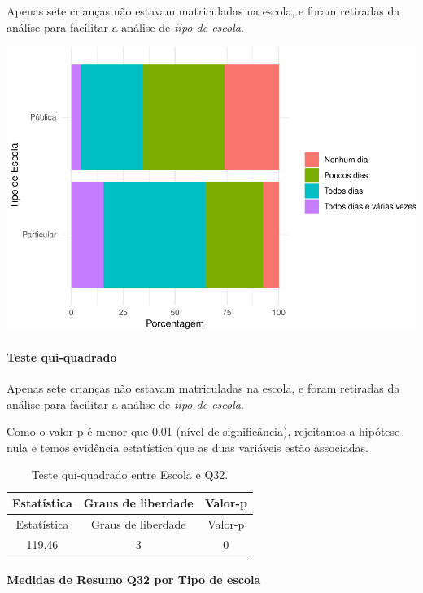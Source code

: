 \documentclass[]{article}
\let\oldparagraph\paragraph
\renewcommand{\paragraph}[1]{\oldparagraph{#1}\mbox{}}
\begin{document}
Apenas sete crianças não estavam matriculadas na escola, e foram retiradas da análise para facilitar a análise de \emph{tipo de escola}.

\begin{center}\includegraphics[width=0.75\linewidth]{relatorio_covid19_files/figure-latex/unnamed-chunk-1115-1} \end{center}

\hypertarget{teste-qui-quadrado-96}{%
\paragraph{Teste qui-quadrado}\label{teste-qui-quadrado-96}}

Apenas sete crianças não estavam matriculadas na escola, e foram retiradas da análise para facilitar a análise de \emph{tipo de escola}.

Como o valor-p é menor que 0.01 (nível de significância), rejeitamos a hipótese nula e temos evidência estatística que as duas variáveis estão associadas.

\begin{longtable}[]{@{}ccc@{}}
\caption{\label{tab:unnamed-chunk-1117}Teste qui-quadrado entre Escola e Q32.}\tabularnewline
\toprule
Estatística & Graus de liberdade & Valor-p\tabularnewline
\midrule
\endfirsthead
\toprule
Estatística & Graus de liberdade & Valor-p\tabularnewline
\midrule
\endhead
119,46 & 3 & 0\tabularnewline
\bottomrule
\end{longtable}

\cleardoublepage

\hypertarget{medidas-de-resumo-q32-por-tipo-de-escola}{%
\paragraph{Medidas de Resumo Q32 por Tipo de escola}\label{medidas-de-resumo-q32-por-tipo-de-escola}}
\end{document}
